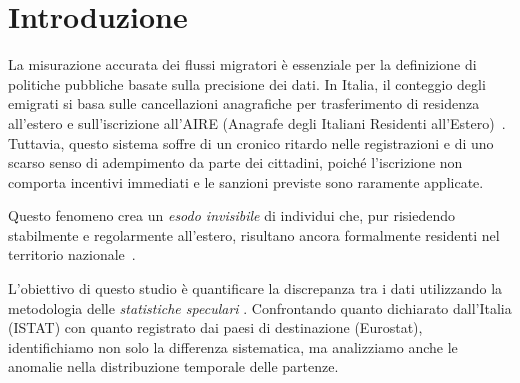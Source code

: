\section{Introduzione}
La misurazione accurata dei flussi migratori è essenziale per la definizione di politiche pubbliche basate sulla precisione dei dati.
In Italia, il conteggio degli emigrati si basa sulle cancellazioni anagrafiche per trasferimento di residenza all'estero e sull'iscrizione all'AIRE (Anagrafe degli Italiani Residenti all'Estero)~\cite{legge470_1988}.
Tuttavia, questo sistema soffre di un cronico ritardo nelle registrazioni e di uno scarso senso di adempimento da parte dei cittadini, poiché l'iscrizione non comporta incentivi immediati e le sanzioni previste sono raramente applicate.

Questo fenomeno crea un \textit{esodo invisibile} di individui che, pur risiedendo stabilmente e regolarmente all'estero, risultano ancora formalmente residenti nel territorio nazionale~\cite{migrantes2022, impicciatore_strozza2016}.

L'obiettivo di questo studio è quantificare la discrepanza tra i dati utilizzando la metodologia delle \emph{statistiche speculari} \cite{abel_cohen2019}.
Confrontando quanto dichiarato dall'Italia (ISTAT) con quanto registrato dai paesi di destinazione (Eurostat), identifichiamo non solo la differenza sistematica, ma analizziamo anche le anomalie nella distribuzione temporale delle partenze.